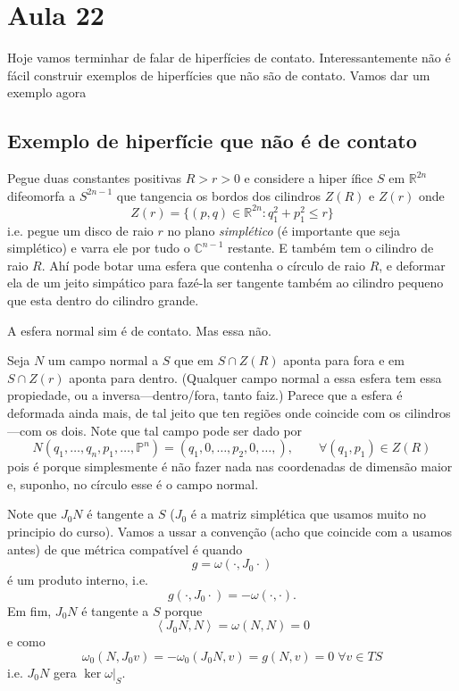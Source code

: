 \section{Aula 22}

Hoje vamos terminhar de falar de hiperfícies de contato. Interessantemente não é fácil construir exemplos de hiperfícies que não são de contato. Vamos dar um exemplo agora

\subsection{Exemplo de hiperfície que não é de contato}

\begin{example}\leavevmode
	Pegue duas constantes positivas $R>r>0$ e considere a hiper ífice $S$ em $\mathbb{R}^{2n}$ difeomorfa a $S^{2n-1}$ que tangencia os bordos dos cilindros $Z(R)$ e $Z(r)$ onde
	 \[Z(r)=\{(p,q)\in\mathbb{R}^{2n}:q_1^2+p_1^2\leq r\}\]
	 i.e. pegue um disco de raio $r$ no plano \textit{simplético} (é importante que seja simplético) e varra ele por tudo o $\mathbb{C}^{n-1}$ restante. E também tem o cilindro de raio $R$. Ahí pode botar uma esfera que contenha o círculo de raio $R$, e deformar ela de um jeito simpático para fazé-la ser tangente também ao cilindro pequeno que esta dentro do cilindro grande.

	 A esfera normal sim é de contato. Mas essa não.

	 Seja $N$ um campo normal a $S$ que em $S\cap Z(R)$ aponta para fora e em $S\cap Z(r)$ aponta para dentro. (Qualquer campo normal a essa esfera tem essa propiedade, ou a inversa---dentro/fora, tanto faiz.) {\color{4}Parece que a esfera é deformada ainda mais, de tal jeito que ten regiões onde coincide com os cilindros---com os dois.} Note que tal campo pode ser dado por
	 \[N( q_1,\ldots,q_n,p_1,\ldots,\mathbb{P}^n)=(q_1,0,\ldots,p_2,0,\ldots,), \qquad \forall (q_1,p_1)\in Z(R)\]
	 pois é porque simplesmente é não fazer nada nas coordenadas de dimensão maior e, suponho, no círculo esse é o campo normal.

	 Note que $J_0N$ é tangente a $S$ ($J_0$ é a matriz simplética que usamos muito no principio do curso). Vamos a ussar a convenção (acho que coincide com a usamos antes) de que métrica compatível é quando
	 \[g=\omega(\cdot,J_0\cdot )\]
	 é um produto interno, i.e.
	 \[g(\cdot,J_0\cdot )=-\omega(\cdot,\cdot ).\]
	 Em fim, $J_0N$ é tangente a $S$ porque
	 \[\left<J_0N,N\right> =\omega(N,N)=0\]
 e como \[\omega_0(N,J_0v)=-\omega_0(J_0N,v)=g(N,v)=0\;\forall v\in TS\]
 i.e. $J_0N$ gera $\ker \omega|_{S}$.


\end{example}
